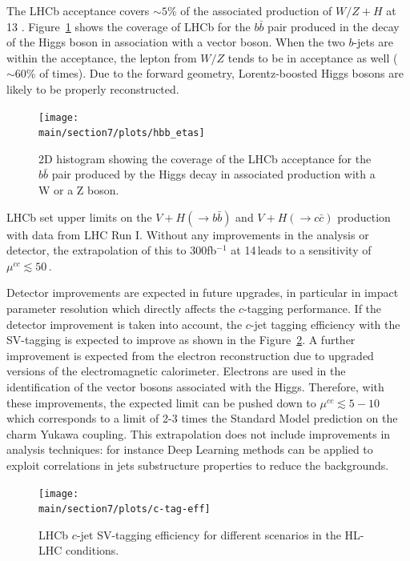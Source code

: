 \documentclass[../report.tex]{subfiles}
\providecommand{\main}{..}
\begin{document}
The LHCb acceptance covers $\sim 5$\% of the associated production of $W/Z+H$ at 13 \UTeV.  Figure~\ref{fig:hbbetas} shows the coverage of  LHCb for the $b\bar{b}$ pair produced in the decay of the  Higgs boson in association with a vector boson. When the two $b$-jets are within the acceptance, the lepton from $W/Z$ tends to be in acceptance as well ($\sim 60$\% of times). Due to the forward geometry, Lorentz-boosted Higgs bosons are  likely to be properly reconstructed.

\begin{figure}[ht]
	\centering
	\texttt{[image: \\main/section7/plots/hbb\_etas]}
	\caption{2D histogram showing the coverage of the LHCb acceptance for the $b\bar{b}$ pair produced by the Higgs decay in associated production with a W or a Z boson.}
	\label{fig:hbbetas}
\end{figure}

LHCb set  upper limits on the $V+H(\rightarrow b \bar{b})$ and $V+H(\rightarrow c \bar{c})$ production~\cite{LHCb:2016yxg} with data from LHC Run I.
Without any improvements in the analysis or detector, the extrapolation of this  to 300fb$^{-1}$ at 14\,\UTeV leads to a sensitivity of $\mu^{cc}\lesssim 50\,$. 

Detector improvements are expected in future upgrades, in particular in impact parameter resolution which directly affects the $c$-tagging performance. 
If the detector improvement is taken into account, the $c$-jet tagging efficiency with the SV-tagging is expected to  improve as shown in the Figure~\ref{fig:c-tag-eff}.  
A further improvement is expected from the electron reconstruction due to upgraded versions of the electromagnetic calorimeter. Electrons are used in the identification of the vector bosons associated with the Higgs.
Therefore, with these improvements, the expected limit can be pushed down to $\mu^{cc}\lesssim 5-10$ which corresponds to a limit of 2-3 times the Standard Model prediction on the charm Yukawa coupling.
This extrapolation does not include improvements in analysis techniques: for instance  Deep Learning methods can be applied to exploit correlations in  jets substructure properties to reduce the backgrounds.


\begin{figure}[ht]
	\centering
	\texttt{[image: \\main/section7/plots/c-tag-eff]}
	\caption{LHCb $c$-jet SV-tagging efficiency for different scenarios in the HL-LHC conditions.}
	\label{fig:c-tag-eff}
\end{figure}
\end{document}
